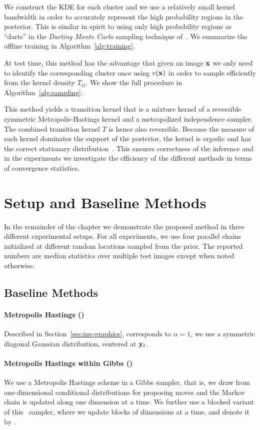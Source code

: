 We construct the KDE for each cluster and we use a relatively small kernel bandwidth in
order to accurately represent the high probability regions in the posterior.
This is similar in spirit to using only high probability regions as ``darts''
in the \emph{Darting Monte Carlo} sampling technique
of~\cite{sminchisescu2011generalized}.
%
We summarize the offline training in Algorithm~\ref{alg:training}.

At test time, this method has the advantage that given an image $\mathbf{x}$
we only need to identify the corresponding cluster once using
$v(\mathbf{x})$ in order to sample efficiently from the kernel density $T_G$.
%
We show the full procedure in Algorithm~\ref{alg:sampling}.

This method yields a transition kernel that is a mixture kernel of a
reversible symmetric Metropolis-Hastings kernel and a metropolized
independence sampler. The combined transition kernel $T$ is hence also
reversible. Because the measure of each kernel dominates the support
of the posterior, the kernel is ergodic and has the correct stationary
distribution~\cite{brooks2011mcmchandbook}.
This ensures correctness of the inference and in the experiments we
investigate the efficiency of the different methods in terms of convergence
statistics.

\section{Setup and Baseline Methods}
\label{sec:experiments-chap3}

In the remainder of the chapter we demonstrate the proposed method in three different
experimental setups.
For all experiments, we use four parallel chains initialized at different
random locations sampled from the prior.
The reported numbers are median statistics over
multiple test images except when noted otherwise.


\subsection{Baseline Methods}
\paragraph{Metropolis Hastings (\MH)}
Described in Section~\ref{sec:inv-graphics},
corresponds to $\alpha=1$, we use a symmetric diagonal
Gaussian distribution, centered at $\mathbf{y}_t$.
%
\paragraph{Metropolis Hastings within Gibbs (\MHWG)}
We use a Metropolis Hastings scheme in a Gibbs sampler, that is, we draw from
one-dimensional conditional distributions for proposing moves and the Markov
chain is updated along one dimension at a time.  We further use a blocked
variant of this \MHWG~sampler,
where we update blocks of dimensions at a time, and denote it by \BMHWG.
%
